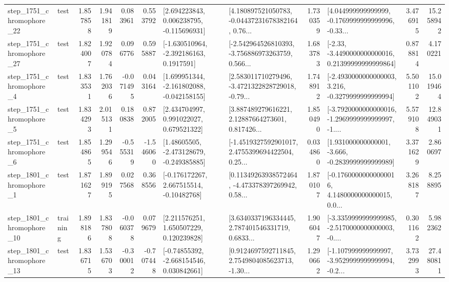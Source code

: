 \begin{tabular}{llrrrrllrlrr}
 step\_1751\_chromophore\_22 &      test &      1.857858 &    1.941819 &      0.083961 &  0.553792 &    [2.694223843, 0.006238795, -0.115696931] &  [4.180897521050783, -0.04437231678382164, 0.76... &       1.730359 &  [4.044999999999999, -0.1769999999999996, -0.33... &            3.476915 &         15.258942 \\
 step\_1751\_chromophore\_27 &      test &      1.824007 &    1.920784 &      0.096776 &  0.595887 &     [-1.630510964, -2.392186163, 0.1917591] &  [-2.542964526810393, -3.756886973263759, 0.566... &       1.683783 &  [-2.33, -3.4490000000000016, 0.21399999999999864] &            0.878814 &          4.170221 \\
  step\_1751\_chromophore\_4 &      test &      1.833531 &    1.762036 &     -0.071495 &  0.043164 &   [1.699951344, -2.161802088, -0.042158155] &  [2.583011710279496, -3.4721322828729018, -0.79... &       1.748912 &  [-2.4930000000000003, 3.216, -0.3279999999999994] &            5.501102 &         15.019464 \\
  step\_1751\_chromophore\_5 &      test &      1.834293 &    2.015131 &      0.180838 &  0.872005 &     [2.434704997, 0.991022027, 0.679521322] &  [3.887489279616221, 2.12887664273601, 0.817426... &       1.850490 &  [-3.7920000000000016, -1.2969999999999997, -1.... &            5.579108 &         12.849031 \\
  step\_1751\_chromophore\_6 &      test &      1.854865 &    1.299546 &     -0.555319 & -1.546060 &    [1.48605505, -2.473128679, -0.249385885] &  [-1.4519327592901017, 2.4755399694422504, 0.25... &       0.034860 &   [1.931000000000001, -3.666, -0.2839999999999989] &            3.371629 &          2.860697 \\
  step\_1801\_chromophore\_1 &      test &      1.871627 &    1.899195 &      0.027568 &  0.368556 &    [-0.176172267, 2.667515514, -0.10482768] &  [0.11349263938572464, -4.473378397269942, 0.58... &       1.870107 &  [-0.17600000000000016, 4.1480000000000015, 0.0... &            3.268187 &          8.258895 \\
 step\_1801\_chromophore\_10 &  training &      1.898186 &    1.837808 &     -0.060378 &  0.079679 &     [2.211576251, 1.650507229, 0.120239828] &  [3.6340337196334445, 2.787401546331719, 0.6833... &       1.906047 &  [-3.3359999999999985, -2.5170000000000003, -0.... &            0.301162 &          5.982362 \\
 step\_1801\_chromophore\_13 &      test &      1.836715 &    1.536703 &     -0.300012 & -0.707448 &    [-0.74855392, -2.668154546, 0.030842661] &  [0.9124697592711845, 2.7549804085623713, -1.30... &       1.290662 &  [-1.107999999999997, -3.9529999999999994, -0.2... &            3.732993 &         27.480811 \\

\end{tabular}
